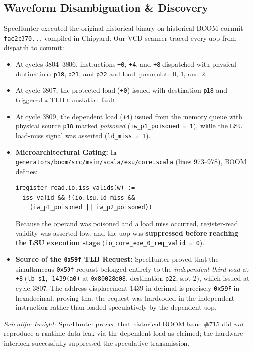 \documentclass[conference,10pt]{IEEEtran}
\begin{document}
\subsection{Waveform Disambiguation \& Discovery}
SpecHunter executed the original historical binary on historical BOOM commit \texttt{fac2c370...} compiled in Chipyard. Our VCD scanner traced every uop from dispatch to commit:
\begin{itemize}
    \item At cycles 3804--3806, instructions \texttt{+0}, \texttt{+4}, and \texttt{+8} dispatched with physical destinations \texttt{p18}, \texttt{p21}, and \texttt{p22} and load queue slots 0, 1, and 2.
    \item At cycle 3807, the protected load (\texttt{+0}) issued with destination \texttt{p18} and triggered a TLB translation fault.
    \item At cycle 3809, the dependent load (\texttt{+4}) issued from the memory queue with physical source \texttt{p18} marked \textit{poisoned} (\texttt{iw\_p1\_poisoned = 1}), while the LSU load-miss signal was asserted (\texttt{ld\_miss = 1}).
    \item \textbf{Microarchitectural Gating:} In \texttt{generators/boom/src/main/scala/exu/core.scala} (lines 973--978), BOOM defines:
\begin{verbatim}
iregister_read.io.iss_valids(w) :=
  iss_valid && !(io.lsu.ld_miss &&
    (iw_p1_poisoned || iw_p2_poisoned))
\end{verbatim}
    Because the operand was poisoned and a load miss occurred, register-read validity was asserted low, and the uop was \textbf{suppressed before reaching the LSU execution stage} (\texttt{io\_core\_exe\_0\_req\_valid = 0}).
    \item \textbf{Source of the \texttt{0x59f} TLB Request:} SpecHunter proved that the simultaneous \texttt{0x59f} request belonged entirely to the \textit{independent third load} at \texttt{+8} (\texttt{lb s1, 1439(a0)} at \texttt{0x80028e08}, destination \texttt{p22}, slot 2), which issued at cycle 3807. The address displacement $1439$ in decimal is precisely \texttt{0x59F} in hexadecimal, proving that the request was hardcoded in the independent instruction rather than loaded speculatively by the dependent uop.
\end{itemize}

\textit{Scientific Insight:} SpecHunter proved that historical BOOM Issue \#715 did \textit{not} reproduce a runtime data leak via the dependent load as claimed; the hardware interlock successfully suppressed the speculative transmission.
\end{document}
